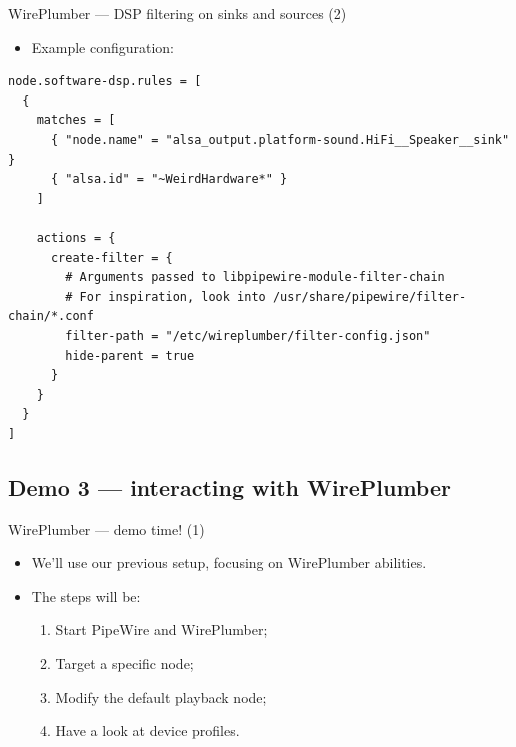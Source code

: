 \begin{frame}[fragile]{WirePlumber — DSP filtering on sinks and sources (2)}
  \begin{itemize}
  \item Example configuration:
  \end{itemize}

    \begin{block}{}
      \fontsize{10}{10}\selectfont
        \begin{verbatim}
node.software-dsp.rules = [
  {
    matches = [
      { "node.name" = "alsa_output.platform-sound.HiFi__Speaker__sink" }
      { "alsa.id" = "~WeirdHardware*" }
    ]

    actions = {
      create-filter = {
        # Arguments passed to libpipewire-module-filter-chain
        # For inspiration, look into /usr/share/pipewire/filter-chain/*.conf
        filter-path = "/etc/wireplumber/filter-config.json"
        hide-parent = true
      }
    }
  }
]
          \end{verbatim}
        \end{block}
\end{frame}






\subsection{Demo 3 — interacting with WirePlumber}



\begin{frame}{WirePlumber — demo time! (1)}
  \begin{itemize}

  \item We'll use our previous setup, focusing on WirePlumber abilities.

  \item The steps will be:

    \begin{enumerate}
    \item Start PipeWire and WirePlumber;
    \item Target a specific node;
    \item Modify the default playback node;
    \item Have a look at device profiles.
    \end{enumerate}

  \end{itemize}
\end{frame}



